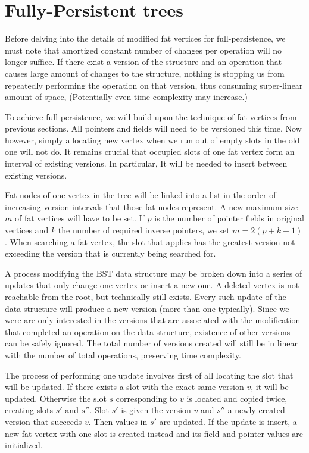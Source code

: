 \section{Fully-Persistent trees}

Before delving into the details of modified fat vertices for full-persistence, we must note that amortized constant number of changes per operation will no longer suffice. If there exist a version of the structure and an operation that causes large amount of changes to the structure, nothing is stopping us from repeatedly performing the operation on that version, thus consuming super-linear amount of space, (Potentially even time complexity may increase.)

To achieve full persistence, we will build upon the technique of fat vertices from previous sections. All pointers and fields will need to be versioned this time. Now however, simply allocating new vertex when we run out of empty slots in the old one will not do. It remains crucial that occupied slots of one fat vertex form an interval of existing versions. In particular, It will be needed to insert between existing versions.

Fat nodes of one vertex in the tree will be linked into a list in the order of increasing version-intervals that those fat nodes represent. A new maximum size $m$ of fat vertices will have to be set. If $p$ is the number of pointer fields in original vertices and $k$ the number of required inverse pointers, we set $m = 2(p+k+1)$.
When searching a fat vertex, the slot that applies has the greatest version not exceeding the version that is currently being searched for.

A process modifying the BST data structure may be broken down into a series of updates that only change one vertex or insert a new one. A deleted vertex is not reachable from the root, but technically still exists.
Every such update of the data structure will produce a new version (more than one typically). Since we were are only interested in the versions that are associated with the modification that completed an operation on the data structure, existence of other versions can be safely ignored. The total number of versions created will still be in linear with the number of total operations, preserving time complexity.

The process of performing one update involves first of all locating the slot that will be updated. If there exists a slot with the exact same version $v$, it will be updated. Otherwise the slot $s$ corresponding to $v$ is located and copied twice, creating slots $s'$ and $s''$. Slot $s'$ is given the version $v$ and $s''$ a newly created version that succeeds $v$. Then values in $s'$ are updated.
If the update is insert, a new fat vertex with one slot is created instead and its field and pointer values are initialized.

